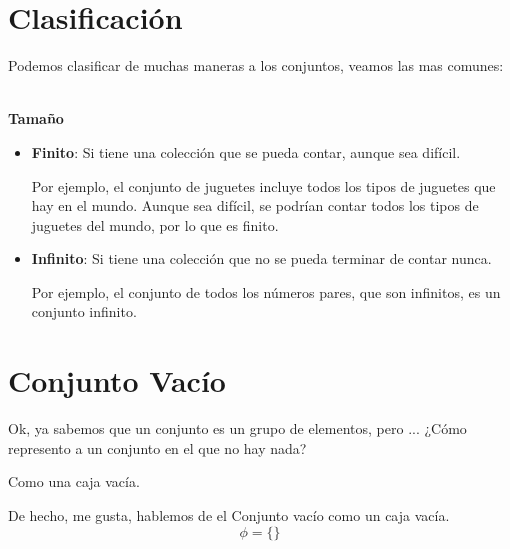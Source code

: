 \documentclass[12pt]{report}                                %
\begin{document}
    \clearpage
    \section{Clasificación}
            
        Podemos clasificar de muchas maneras a los conjuntos, veamos las mas comunes:

        \textbf{\large \\Tamaño}

        \begin{itemize}
            \item \textbf{Finito}:
                Si tiene una colección que se pueda contar, aunque sea difícil.

                Por ejemplo, el conjunto de juguetes incluye todos los tipos de
                juguetes que hay en el mundo. Aunque sea difícil, se podrían contar
                todos los tipos de juguetes del mundo, por lo que es finito.

            \item \textbf{Infinito}:
                Si tiene una colección que no se pueda terminar de contar nunca.

                Por ejemplo, el conjunto de todos los números pares, que son
                infinitos, es un conjunto infinito.
        \end{itemize}


    \clearpage
    \section{Conjunto Vacío}
            
        Ok, ya sabemos que un conjunto es un grupo de elementos, pero ...
        ¿Cómo represento a un conjunto en el que no hay nada?

        Como una caja vacía.

        De hecho, me gusta, hablemos de el Conjunto vacío como un caja vacía.
        \begin{equation}   
            \phi = \{ \}
        \end{equation}
\end{document}
